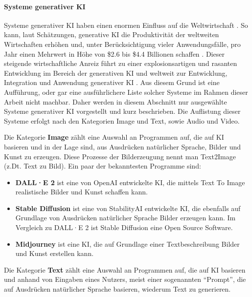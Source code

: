 \paragraph{Systeme generativer KI}
\label{sec2:sota:par:genai-systems}
Systeme generativer KI haben einen enormen Einfluss auf die Weltwirtschaft \cite{mckinsey-economic-genai}.
So kann, laut Schätzungen, generative KI die Produktivität der weltweiten Wirtschaften erhöhen und, unter Berücksichtigung vieler Anwendungsfälle, pro Jahr einen Mehrwert in Höhe von \$2.6 bis \$4.4 Billionen schaffen \cite{mckinsey-economic-genai}.
Dieser steigende wirtschaftliche Anreiz führt zu einer explosionsartigen und rasanten Entwicklung im Bereich der generativen KI und weltweit zur Entwicklung, Integration und Anwendung generativer KI \cite{mckinsey-economic-genai,statista-forecast-ai-market-size}.
Aus diesem Grund ist eine Aufführung, oder gar eine ausführlichere Liste solcher Systeme im Rahmen dieser Arbeit nicht machbar.
Daher werden in diesem Abschnitt nur ausgewählte Systeme generativer KI vorgestellt und kurz beschrieben.
Die Auflistung dieser Systeme erfolgt nach den Kategorien Image und Text, sowie Audio und Video.

Die Kategorie \textbf{Image} zählt eine Auswahl an Programmen auf, die auf KI basieren und in der Lage sind, aus Ausdrücken natürlicher Sprache, Bilder und Kunst zu erzeugen.
Diese Prozesse der Bilderzeugung nennt man Text2Image (z.Dt. Text zu Bild).
Ein paar der bekanntesten Programme sind:

\begin{itemize}
    \item \textbf{DALL·E 2} \cite{dall-e-2} ist eine von OpenAI \cite{openai} entwickelte KI, die mittels Text To Image realistische Bilder und Kunst schaffen kann.
    \item \textbf{Stable Diffusion} \cite{stable-diffusion} ist eine von StabilityAI \cite{stabilityai} entwickelte KI, die ebenfalls auf Grundlage von Ausdrücken natürlicher Sprache Bilder erzeugen kann.
    Im Vergleich zu DALL·E 2 ist Stable Diffusion eine Open Source Software.
    \item \textbf{Midjourney} \cite{midjourney} ist eine KI, die auf Grundlage einer Textbeschreibung Bilder und Kunst erstellen kann.
\end{itemize}

Die Kategorie \textbf{Text} zählt eine Auswahl an Programmen auf, die auf KI basieren und anhand von Eingaben eines Nutzers, meist einer sogenannten \enquote{Prompt}, die auf Ausdrücken natürlicher Sprache basieren, wiederum Text zu generieren.

